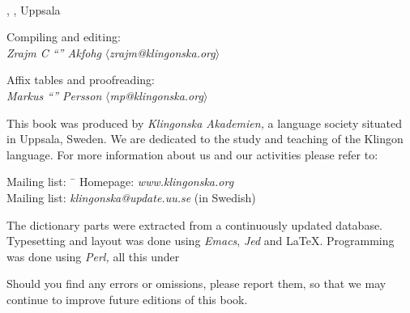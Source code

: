 \begin{center}
  \\
  \edition, \compiledate, Uppsala

  \vspace{4mm}
  \small Compiling and editing: \\
  \textit{Zrajm C ``'' Akfohg}
  $\langle$\textit{zrajm@klingonska.org}$\rangle$ 

  \vspace{2mm}
  Affix tables and proofreading:\\
  \textit{Markus ``'' Persson}
  $\langle$\textit{mp@klingonska.org}$\rangle$
\end{center}


\small\noindent This book was produced by \textit{Kling\-on\-ska
Aka\-demi\-en,} a language society situated in Uppsala, Sweden. We are
dedicated to the study and teaching of the Klingon language. For more
information about us and our activities please refer to:

\begin{tabbing}
\indent Mailing list: \ \= \kill
\indent Homepage: \> \textit{www.klingonska.org}\\
\indent Mailing list: \> \textit{klingonska@update.uu.se} (in Swedish)
\end{tabbing}

\noindent The dictionary parts were extracted from a continuously
updated database. Typesetting and layout was done using
\textit{Emacs}, \textit{Jed} and \LaTeX. Programming was done using
\textit{Perl,} all this under 

Should you find any errors or omissions, please report them, so that
we may continue to improve future editions of this book.

\newpage
\normalsize
